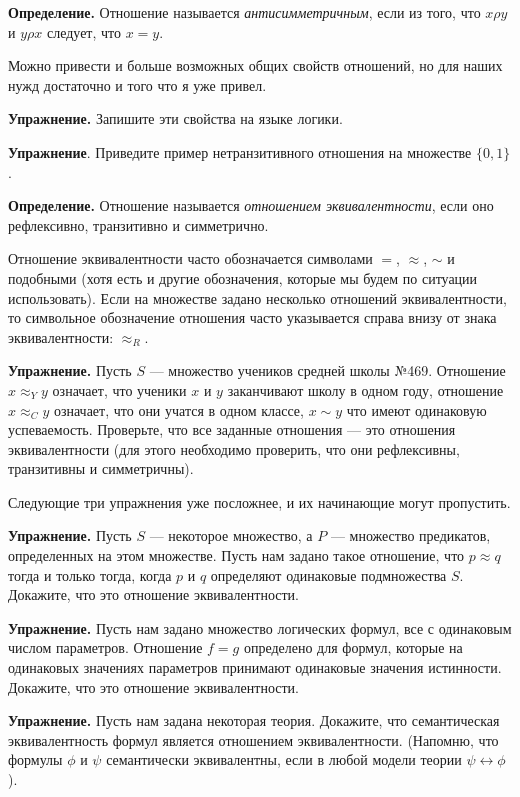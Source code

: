 {\bfseries Определение.} Отношение называется {\slshape антисимметричным}, если из того, что $x \rho y$ и $y \rho x$ следует, что $x = y$.

Можно привести и больше возможных общих свойств отношений, но для наших нужд достаточно и того что я уже привел.

{\bfseries Упражнение.} Запишите эти свойства на языке логики.

{\bfseries Упражнение}. Приведите пример нетранзитивного отношения на множестве $\{0, 1\}$.

{\bfseries Определение.} Отношение называется {\slshape отношением эквивалентности}, если оно рефлексивно, транзитивно и симметрично.

Отношение эквивалентности часто обозначается символами $=$, $\approx$, $\sim$ и подобными (хотя есть и другие обозначения, которые мы будем по ситуации использовать). Если на множестве задано несколько отношений эквивалентности, то символьное обозначение отношения часто указывается справа внизу от знака эквивалентности: $\approx_R$.

{\bfseries Упражнение.} Пусть $S$ — множество учеников средней школы №469. Отношение $x\approx_Y y$ означает, что ученики $x$ и $y$ заканчивают школу в одном году, отношение $x \approx_C y$ означает, что они учатся в одном классе, $x \sim y$ что имеют одинаковую успеваемость. Проверьте, что все заданные отношения — это отношения эквивалентности (для этого необходимо проверить, что они рефлексивны, транзитивны и симметричны).

Следующие три упражнения уже посложнее, и их начинающие могут пропустить.

{\bfseries Упражнение.} Пусть $S$ — некоторое множество, а $P$ — множество предикатов, определенных на этом множестве. Пусть нам задано такое отношение, что $p \approx q$ тогда и только тогда, когда $p$ и $q$ определяют одинаковые подмножества $S$. Докажите, что это отношение эквивалентности.

{\bfseries Упражнение.} Пусть нам задано множество логических формул, все с одинаковым числом параметров. Отношение $f=g$ определено для формул, которые на одинаковых значениях параметров принимают одинаковые значения истинности. Докажите, что это отношение эквивалентности.

{\bfseries Упражнение.} Пусть нам задана некоторая теория. Докажите, что семантическая эквивалентность формул является отношением эквивалентности. (Напомню, что формулы $\phi$ и $\psi$ семантически эквивалентны, если в любой модели теории $\psi\leftrightarrow\phi$).

